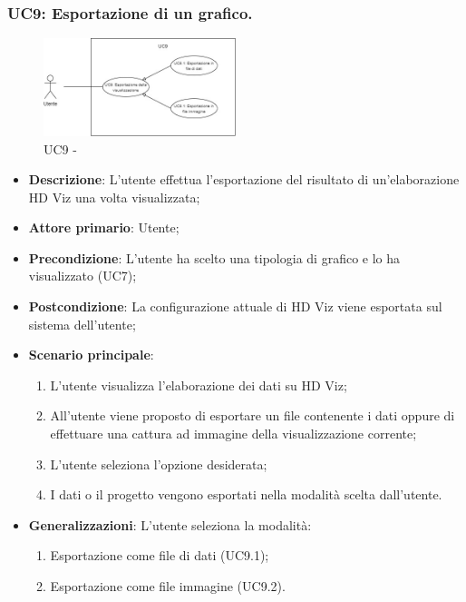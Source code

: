 \subsubsection{UC9: Esportazione di un grafico.}
\label{sub:uc9}

\begin{figure}[h]
    \centering
    \includegraphics[width=0.5\textwidth]{componenti/casi-duso/diagrammi/UC9.jpg}
    \caption{UC9 - }
    \label{fig:UC9}
\end{figure}


\begin{itemize}
    \item{\textbf{Descrizione}}: L'utente effettua l'esportazione del risultato di un'elaborazione HD Viz una volta visualizzata;
    \item{\textbf{Attore primario}}: Utente;
    \item{\textbf{Precondizione}}: L'utente ha scelto una tipologia di grafico e lo ha visualizzato (UC7);
    \item{\textbf{Postcondizione}}: La configurazione attuale di HD Viz viene esportata sul sistema dell'utente;
    \item{\textbf{Scenario principale}}:
    \begin{enumerate}
        \item   L'utente visualizza l'elaborazione dei dati su HD Viz;
        \item   All'utente viene proposto di esportare un file contenente i dati oppure 
                di effettuare una cattura ad immagine della visualizzazione corrente;
        \item   L'utente seleziona l'opzione desiderata;
        \item   I dati o il progetto vengono esportati nella modalità scelta dall'utente.
    \end{enumerate}
    
    \item{\textbf{Generalizzazioni}}: L'utente seleziona la modalità:
    \begin{enumerate}
        \item   Esportazione come file di dati (UC9.1);
        \item   Esportazione come file immagine (UC9.2).
    \end{enumerate} 
\end{itemize}

